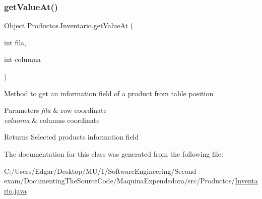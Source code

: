 \subsubsection{\texorpdfstring{get\+Value\+At()}{getValueAt()}}
{\footnotesize\ttfamily Object Productos.\+Inventario.\+get\+Value\+At (\begin{DoxyParamCaption}\item[{int}]{fila,  }\item[{int}]{columna }\end{DoxyParamCaption})\hspace{0.3cm}{\ttfamily [inline]}}

Method to get an information field of a product from table position 
\begin{DoxyParams}{Parameters}
{\em fila} & row coordinate \\
\hline
{\em columna} & columns coordinate \\
\hline
\end{DoxyParams}
\begin{DoxyReturn}{Returns}
Selected product\textquotesingle{}s information field 
\end{DoxyReturn}


The documentation for this class was generated from the following file\+:\begin{DoxyCompactItemize}
\item 
C\+:/\+Users/\+Edgar/\+Desktop/\+M\+U/1/\+Software\+Engineering/\+Second exam/\+Documenting\+The\+Source\+Code/\+Maquina\+Expendedora/src/\+Productos/\mbox{\hyperlink{_inventario_8java}{Inventario.\+java}}\end{DoxyCompactItemize}
